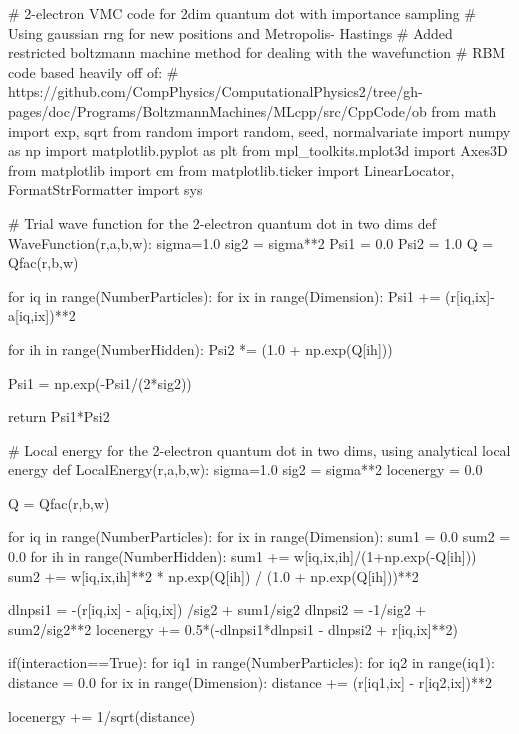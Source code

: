 \documentclass[%
oneside,                 %
final,                   %
10pt]{article}
\begin{document}
\bpycod
# 2-electron VMC code for 2dim quantum dot with importance sampling
# Using gaussian rng for new positions and Metropolis- Hastings 
# Added restricted boltzmann machine method for dealing with the wavefunction
# RBM code based heavily off of:
# https://github.com/CompPhysics/ComputationalPhysics2/tree/gh-pages/doc/Programs/BoltzmannMachines/MLcpp/src/CppCode/ob
from math import exp, sqrt
from random import random, seed, normalvariate
import numpy as np
import matplotlib.pyplot as plt
from mpl_toolkits.mplot3d import Axes3D
from matplotlib import cm
from matplotlib.ticker import LinearLocator, FormatStrFormatter
import sys



# Trial wave function for the 2-electron quantum dot in two dims
def WaveFunction(r,a,b,w):
    sigma=1.0
    sig2 = sigma**2
    Psi1 = 0.0
    Psi2 = 1.0
    Q = Qfac(r,b,w)
    
    for iq in range(NumberParticles):
        for ix in range(Dimension):
            Psi1 += (r[iq,ix]-a[iq,ix])**2
            
    for ih in range(NumberHidden):
        Psi2 *= (1.0 + np.exp(Q[ih]))
        
    Psi1 = np.exp(-Psi1/(2*sig2))

    return Psi1*Psi2

# Local energy  for the 2-electron quantum dot in two dims, using analytical local energy
def LocalEnergy(r,a,b,w):
    sigma=1.0
    sig2 = sigma**2
    locenergy = 0.0
    
    Q = Qfac(r,b,w)

    for iq in range(NumberParticles):
        for ix in range(Dimension):
            sum1 = 0.0
            sum2 = 0.0
            for ih in range(NumberHidden):
                sum1 += w[iq,ix,ih]/(1+np.exp(-Q[ih]))
                sum2 += w[iq,ix,ih]**2 * np.exp(Q[ih]) / (1.0 + np.exp(Q[ih]))**2
    
            dlnpsi1 = -(r[iq,ix] - a[iq,ix]) /sig2 + sum1/sig2
            dlnpsi2 = -1/sig2 + sum2/sig2**2
            locenergy += 0.5*(-dlnpsi1*dlnpsi1 - dlnpsi2 + r[iq,ix]**2)
            
    if(interaction==True):
        for iq1 in range(NumberParticles):
            for iq2 in range(iq1):
                distance = 0.0
                for ix in range(Dimension):
                    distance += (r[iq1,ix] - r[iq2,ix])**2
                    
                locenergy += 1/sqrt(distance)
                
\end{document}
